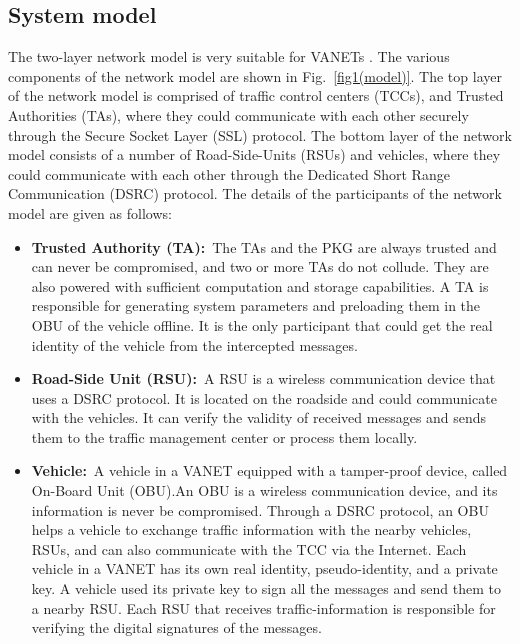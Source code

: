 \documentclass[10pt,journal,letterpaper]{IEEEtran}
\begin{document}
\subsection{System model}\label{L111}
The two-layer network model is very suitable for VANETs \cite{r7}.
The various components of the network model are shown in
Fig.~\ref{fig1(model)}. The top layer of the network model is
comprised of traffic control centers (TCCs), and Trusted Authorities
(TAs), where they could communicate with each other securely through
the Secure Socket Layer (SSL) protocol. The bottom layer of the
network model consists of a number of Road-Side-Units (RSUs) and
vehicles, where they could communicate with each other through the
Dedicated Short Range Communication (DSRC) protocol\textcolor{blue}{\cite{r19}}. The details of the
participants of the network model are given as follows:
\begin{itemize}
\item \textbf{Trusted Authority (TA):}~The TAs and the PKG are always
trusted and can never be compromised, and two or more TAs do not
collude. They are also powered with sufficient computation and
storage capabilities. A TA is responsible for generating system
parameters and preloading them in the OBU of the vehicle offline. It
is the only participant that could get the real identity of the
vehicle from the intercepted messages.
\item \textbf{Road-Side Unit (RSU):}~A RSU is a wireless communication
device that uses a DSRC protocol. It is located on the roadside and
could communicate with the vehicles. It can verify the validity of
received messages and sends them to the traffic management center or
process them locally.
\item \textbf{Vehicle:}~A vehicle in a VANET equipped with a tamper-proof
device, called On-Board Unit (OBU).An OBU is a wireless
communication device, and its information is never be compromised.
Through a DSRC protocol, an OBU helps a vehicle to exchange traffic
information with the nearby vehicles, RSUs, and can also communicate
with the TCC via the Internet. Each vehicle in a VANET has its own
real identity, pseudo-identity, and a private key. A vehicle used
its private key to sign all the messages and send them to a nearby
RSU. Each RSU that receives traffic-information is responsible for
verifying the digital signatures of the messages.
\end{itemize}
\end{document}
